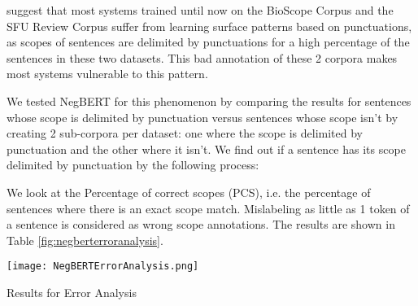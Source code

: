 \documentclass[10pt, a4paper]{article}
\begin{document}
 suggest that most systems trained until now on the BioScope Corpus and the SFU Review Corpus suffer from learning surface patterns based on punctuations, as scopes of sentences are delimited by punctuations for a high percentage of the sentences in these two datasets. This bad annotation of these 2 corpora makes most systems vulnerable to this pattern.
\par We tested NegBERT for this phenomenon by comparing the results for sentences whose scope is delimited by punctuation versus sentences whose scope isn’t by creating 2 sub-corpora per dataset: one where the scope is delimited by punctuation and the other where it isn’t. We find out if a sentence has its scope delimited by punctuation by the following process:
\par We look at the Percentage of correct scopes (PCS), i.e. the percentage of sentences where there is an exact scope match. Mislabeling as little as 1 token of a sentence is considered as wrong scope annotations. The results are shown in Table \ref{fig:negberterroranalysis}.

\begin{table}[h]
    \centering
    \texttt{[image: NegBERTErrorAnalysis.png]}
    \caption{Results for Error Analysis}
    \label{fig:negberterroranalysis}
\end{table}
\end{document}
